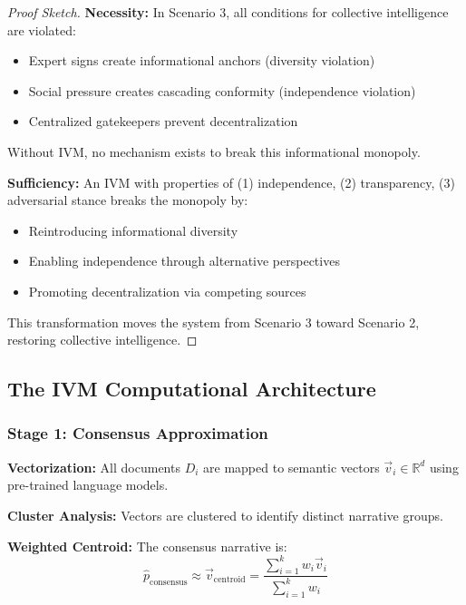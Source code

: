 \documentclass[11pt,a4paper]{article}
\theoremstyle{definition}
\theoremstyle{remark}
\newcommand{\RR}{\mathbb{R}}
\begin{document}
\begin{small}
\begin{proof}[Proof Sketch]
\textbf{Necessity:} In Scenario 3, all conditions for collective intelligence are violated:
\begin{itemize}
\item Expert signs create informational anchors (diversity violation)
\item Social pressure creates cascading conformity (independence violation)  
\item Centralized gatekeepers prevent decentralization
\end{itemize}

Without IVM, no mechanism exists to break this informational monopoly.

\textbf{Sufficiency:} An IVM with properties of (1) independence, (2) transparency, (3) adversarial stance breaks the monopoly by:
\begin{itemize}
\item Reintroducing informational diversity
\item Enabling independence through alternative perspectives
\item Promoting decentralization via competing sources
\end{itemize}

This transformation moves the system from Scenario 3 toward Scenario 2, restoring collective intelligence.
\end{proof}

\subsection{The IVM Computational Architecture}

\subsubsection{Stage 1: Consensus Approximation}

\textbf{Vectorization:} All documents $D_i$ are mapped to semantic vectors $\vec{v}_i \in \RR^d$ using pre-trained language models.

\textbf{Cluster Analysis:} Vectors are clustered to identify distinct narrative groups.

\textbf{Weighted Centroid:} The consensus narrative is:
\begin{equation}
\hat{p}_{\text{consensus}} \approx \vec{v}_{\text{centroid}} = \frac{\sum_{i=1}^{k} w_i \vec{v}_i}{\sum_{i=1}^{k} w_i}
\end{equation}


\end{small}
\end{document}
